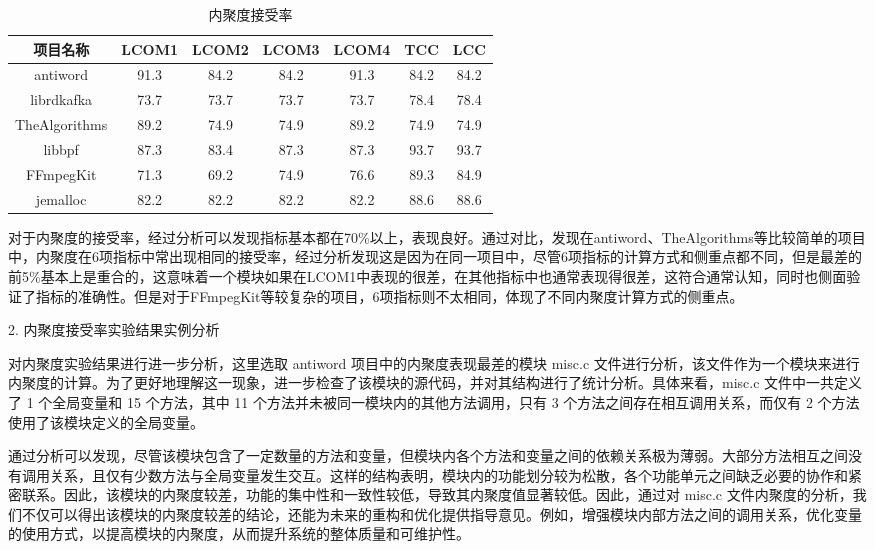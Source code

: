 \begin{table}[htbp]
\caption{内聚度接受率}
\vspace{0.5em}\centering\wuhao
\begin{tabular}{ccccccc}
\toprule
项目名称 & LCOM1 & LCOM2 & LCOM3 & LCOM4 & TCC & LCC \\
\midrule
antiword & 91.3 & 84.2 & 84.2 & 91.3 & 84.2 & 84.2 \\
librdkafka & 73.7 & 73.7 & 73.7 & 73.7 & 78.4 & 78.4 \\
TheAlgorithms & 89.2 & 74.9 & 74.9 & 89.2 & 74.9 & 74.9 \\
libbpf & 87.3 & 83.4 & 87.3 & 87.3 & 93.7 &  93.7 \\
FFmpegKit & 71.3 & 69.2 & 74.9 & 76.6 & 89.3 & 84.9 \\
jemalloc & 82.2 & 82.2 & 82.2 & 82.2 & 88.6 & 88.6 \\
\bottomrule
\end{tabular}
\end{table}
对于内聚度的接受率，经过分析可以发现指标基本都在70\%以上，表现良好。通过对比，发现在antiword、TheAlgorithms等比较简单的项目中，内聚度在6项指标中常出现相同的接受率，经过分析发现这是因为在同一项目中，尽管6项指标的计算方式和侧重点都不同，但是最差的前5\%基本上是重合的，这意味着一个模块如果在LCOM1中表现的很差，在其他指标中也通常表现得很差，这符合通常认知，同时也侧面验证了指标的准确性。但是对于FFmpegKit等较复杂的项目，6项指标则不太相同，体现了不同内聚度计算方式的侧重点。

2. 内聚度接受率实验结果实例分析

对内聚度实验结果进行进一步分析，这里选取 antiword 项目中的内聚度表现最差的模块 misc.c 文件进行分析，该文件作为一个模块来进行内聚度的计算。为了更好地理解这一现象，进一步检查了该模块的源代码，并对其结构进行了统计分析。具体来看，misc.c 文件中一共定义了 1 个全局变量和 15 个方法，其中 11 个方法并未被同一模块内的其他方法调用，只有 3 个方法之间存在相互调用关系，而仅有 2 个方法使用了该模块定义的全局变量。

通过分析可以发现，尽管该模块包含了一定数量的方法和变量，但模块内各个方法和变量之间的依赖关系极为薄弱。大部分方法相互之间没有调用关系，且仅有少数方法与全局变量发生交互。这样的结构表明，模块内的功能划分较为松散，各个功能单元之间缺乏必要的协作和紧密联系。因此，该模块的内聚度较差，功能的集中性和一致性较低，导致其内聚度值显著较低。因此，通过对 misc.c 文件内聚度的分析，我们不仅可以得出该模块的内聚度较差的结论，还能为未来的重构和优化提供指导意见。例如，增强模块内部方法之间的调用关系，优化变量的使用方式，以提高模块的内聚度，从而提升系统的整体质量和可维护性。

